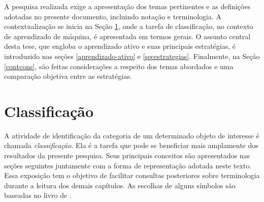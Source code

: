 A pesquisa realizada exige a apresentação dos temas pertinentes e as definições adotadas no presente documento, incluindo notação e terminologia.
A contextualização se inicia na Seção \ref{cla}, onde a tarefa de classificação, no contexto de aprendizado de máquina, é apresentada em termos gerais.
O assunto central desta tese, que engloba o aprendizado ativo e suas principais estratégias, é introduzido nas seções \ref{aprendizado-ativo} e \ref{secestrategias}.
Finalmente, na Seção \ref{contcons}, são feitas considerações a respeito dos temas abordados e uma comparação objetiva entre as estratégias.

\section{Classificação}\label{cla}
A atividade de identificação da categoria de um determinado objeto de interesse é chamada \textit{classificação}.
Ela é a tarefa que pode se beneficiar mais amplamente dos resultados da presente pesquisa.
Seus principais conceitos são apresentados nas seções seguintes juntamente com a forma de representação adotada neste texto.
Essa exposição tem o objetivo de facilitar consultas posteriores sobre terminologia durante a leitura dos demais capítulos.
As escolhas de alguns símbolos são baseadas no livro de .

